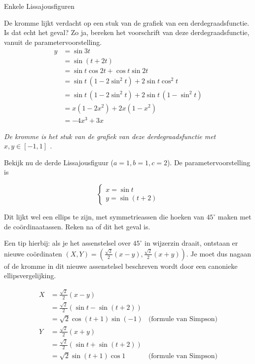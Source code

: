 \begin{lesactiviteit}{Enkele Lissajousfiguren}
\begin{vraagenantwoord}[resume]
    \item De kromme lijkt verdacht op een stuk van de grafiek van een derdegraadsfunctie. Is dat echt het geval? Zo ja, bereken het voorschrift van deze derdegraadsfunctie, vanuit de parametervoorstelling.
    \newpage
    $$
    \begin{array}{rl}
         y&= \sin{3t} \\
         & =\sin{(t+2t)}\\
         & =\sin{t}\cos{2t}+\cos{t}\sin{2t}\\
         & =\sin{t}\,(1-2\sin^2{t})+2\sin{t}\cos^2{t}\\
         & = \sin{t}\,(1-2\sin^2{t})+2\sin{t}\,(1-\sin^2{t})\\
         & = x(1-2x^2)+2x(1-x^2)\\
         & = -4x^3+3x
    \end{array}
    $$
    
    \emph{De kromme is het stuk van de grafiek van deze derdegraadsfunctie met $x,y\in [-1,1]$ .}
    
    \end{vraagenantwoord}
    
     Bekijk nu de derde Lissajousfiguur ($a=1, b=1, c=2$). De parametervoorstelling is
    
    $$\left\{ 
    \begin{array}{l}
         x = \sin{t}\\
         y = \sin{(t+2)}
    \end{array}
    \right.$$
    
    \begin{vraagenantwoord}[resume]
    
    \item Dit lijkt wel een ellips te zijn, met symmetrieassen die hoeken van $45^\circ$ maken met de coördinaatassen. Reken na of dit het geval is. 
    
    Een tip hierbij: als je het assenstelsel over $45^\circ$ in wijzerzin draait, ontstaan er nieuwe coördinaten $(X, Y)=\left(\frac{\sqrt{2}}{2} (x-y),\frac{\sqrt{2}}{2} (x+y)\right)$. Je moet dus nagaan of de kromme in dit nieuwe assenstelsel beschreven wordt door een canonieke ellipsvergelijking.
    
    
    $$ 
    \begin{array}{lll}
         X &= \frac{\sqrt{2}}{2} (x-y) & \\
         &= \frac{\sqrt{2}}{2} \left(\sin{t}-\sin{(t+2)}\right) & \\
         &=\sqrt{2} \cos{(t+1)}\sin{(-1)}&\text{(formule van Simpson)}\\
         Y&= \frac{\sqrt{2}}{2} (x+y) & \\
         &= \frac{\sqrt{2}}{2} \left(\sin{t}+\sin{(t+2)}\right) & \\
         &=\sqrt{2} \sin{(t+1)}\cos{1}&\text{(formule van Simpson)}\\
    \end{array}
    $$ 
    

\end{vraagenantwoord}
\end{lesactiviteit}
